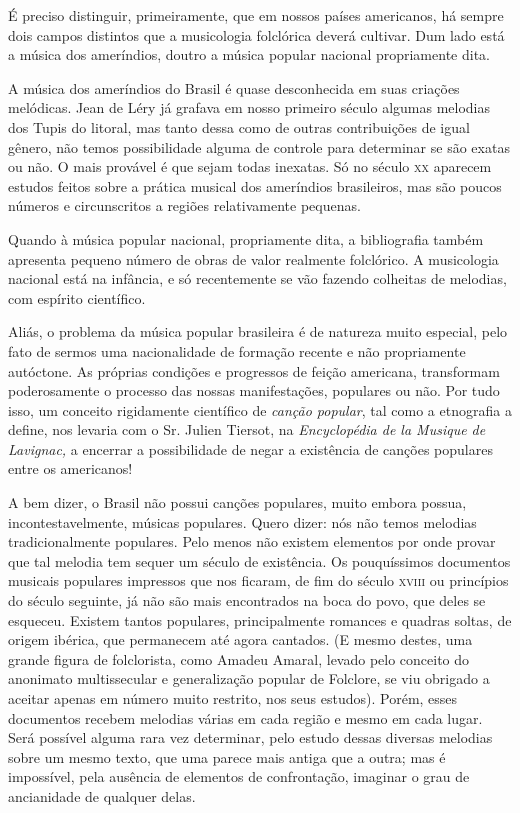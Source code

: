 É preciso distinguir, primeiramente, que em nossos países americanos, há
sempre dois campos distintos que a musicologia folclórica deverá
cultivar. Dum lado está a música dos ameríndios, doutro a música popular
nacional propriamente dita.

A música dos ameríndios do Brasil é quase desconhecida em suas criações
melódicas. Jean de Léry já grafava em nosso primeiro século algumas
melodias dos Tupis do litoral, mas tanto dessa como de outras
contribuições de igual gênero, não temos possibilidade alguma de
controle para determinar se são exatas ou não. O mais provável é que
sejam todas inexatas. Só no século \textsc{xx} aparecem estudos feitos sobre a
prática musical dos ameríndios brasileiros, mas são poucos números e
circunscritos a regiões relativamente pequenas.

Quando à música popular nacional, propriamente dita, a bibliografia
também apresenta pequeno número de obras de valor realmente folclórico.
A musicologia nacional está na infância, e só recentemente se vão
fazendo colheitas de melodias, com espírito científico.

Aliás, o problema da música popular brasileira é de natureza muito
especial, pelo fato de sermos uma nacionalidade de formação recente e
não propriamente autóctone. As próprias condições e progressos de feição
americana, transformam poderosamente o processo das nossas
manifestações, populares ou não. Por tudo isso, um conceito rigidamente
científico de \textit{canção popular}, tal como a etnografia a define, nos
levaria com o Sr. Julien Tiersot, na \emph{Encyclopédia de la Musique de
Lavignac,} a encerrar a possibilidade de negar a existência de canções
populares entre os americanos!

A bem dizer, o Brasil não possui canções populares, muito embora possua,
incontestavelmente, músicas populares. Quero dizer: nós não temos
melodias tradicionalmente populares. Pelo menos não existem elementos
por onde provar que tal melodia tem sequer um século de existência. Os
pouquíssimos documentos musicais populares impressos que nos ficaram, de
fim do século \textsc{xviii} ou princípios do século seguinte, já não são mais
encontrados na boca do povo, que deles se esqueceu. Existem tantos
populares, principalmente romances e quadras soltas, de origem ibérica,
que permanecem até agora cantados. (E mesmo destes, uma grande figura de
folclorista, como Amadeu Amaral, levado pelo conceito do anonimato
multissecular e generalização popular de Folclore, se viu obrigado a
aceitar apenas em número muito restrito, nos seus estudos). Porém, esses
documentos recebem melodias várias em cada região e mesmo em cada lugar.
Será possível alguma rara vez determinar, pelo estudo dessas diversas
melodias sobre um mesmo texto, que uma parece mais antiga que a outra;
mas é impossível, pela ausência de elementos de confrontação, imaginar o
grau de ancianidade de qualquer delas.

